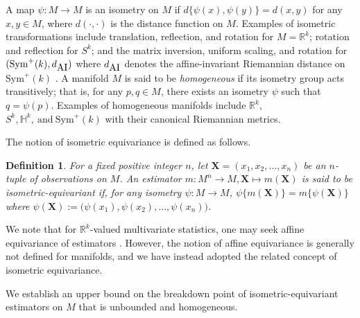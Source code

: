\documentclass[preprint]{imsart}
\newcommand{\bbH}{\mathbb{H}}
\newcommand{\bbR}{\mathbb{R}}
\newcommand{\bX}{\mathbf{X}}
\def\Frechet{Fr\'{e}chet}
\theoremstyle{plain}
\newtheorem{definition}{Definition}
\theoremstyle{remark}
\begin{document}
A map $\psi:M \rightarrow M$ is an isometry on $M$ if $d\{\psi(x),\psi(y)\} = d(x,y)$ for any $x, y \in M$, where $d(\cdot,\cdot)$ is the distance function on $M$. Examples of isometric transformations include translation, reflection, and rotation for $M=\bbR^{k}$;  rotation and reflection for $S^k$; and the matrix inversion, uniform scaling, and rotation for $(\mbox{Sym}^{+}(k), d_{\mbox{\tiny AI}})$ where $d_{\mbox{\tiny AI}}$ denotes the affine-invariant Riemannian distance on $\mbox{Sym}^{+}(k)$ \citep{pennec2006riemannian}. A manifold $M$ is said to be \emph{homogeneous} if its isometry group acts transitively; that is, for any $p,q\in M$, there exists an isometry $\psi$ such that $q = \psi(p)$. Examples of homogeneous manifolds include $\bbR^{k}$, $S^{k}, \bbH^{k}, ~ \mbox{and} ~ \mbox{Sym}^{+}(k)$ with their canonical Riemannian metrics. 

The notion of isometric equivariance is defined as follows.


\begin{definition}
For a fixed positive integer $n$, let $\bX = (x_{1}, x_{2}, ..., x_{n})$ be an $n$-tuple of observations on $M$. An estimator $m:M^{n} \rightarrow M, \bX \mapsto m(\bX)$ is said to be \emph{isometric-equivariant} if, for any isometry $\psi:M \rightarrow M$, $\psi\{m(\bX)\} = m\{\psi(\bX)\}$ where $\psi(\bX):= \big(\psi(x_{1}), \psi(x_{2}), ..., \psi(x_{n})\big)$.
\end{definition}

We note that for $\mathbb{R}^k$-valued multivariate statistics, one may seek affine equivariance of estimators \citep[e.g.,][]{scealy2021analogues}. However, the notion of affine equivariance is generally not defined for manifolds, and we have instead adopted the related concept of isometric equivariance.  
 

We establish an upper bound on the breakdown point of isometric-equivariant estimators on $M$ that is unbounded and homogeneous.


\end{document}
